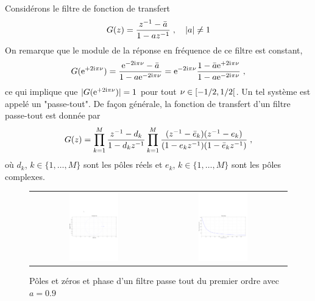 \begin{example}
Considérons le filtre de fonction de transfert
\[
G(z)= \frac{z^{-1} - \bar{a}}{1-a z^{-1}} \;, \quad |a| \ne 1
\]
On remarque que le module de la réponse en fréquence de ce filtre est constant, \ie\
\[
G(\mathrm{e}^{+2 \mathrm{i} \pi \nu})= \frac{\mathrm{e}^{-2 \mathrm{i} \pi \nu} - \bar{a}}{1 - a \mathrm{e}^{-2 \mathrm{i} \pi \nu}}= \mathrm{e}^{-2 \mathrm{i} \pi \nu} \frac{1 - \bar{a} \mathrm{e}^{+2 \mathrm{i} \pi \nu}}{1 - a \mathrm{e}^{-2 \mathrm{i} \pi \nu}} \;,
\]
ce qui implique que $|G(\mathrm{e}^{+2 \mathrm{i} \pi \nu})|= 1$ pour tout $\nu \in \left[-1/2,1/2\right[$. Un tel système est appelé un "passe-tout". De façon générale, la fonction de transfert d'un filtre passe-tout est donnée par
\[
G(z)= \prod_{k=1}^M \frac{z^{-1} - d_k}{1 - d_k z^{-1}} \prod_{k=1}^M \frac{(z^{-1} - \bar{e}_k)(z^{-1}-e_k)}{(1-e_k z^{-1})(1-\bar{e}_k z^{-1})} \;,
\]
où $d_k$, $k \in \{1,\dots,M\}$ sont les pôles réels et $e_k$, $k \in \{1,\dots,M\}$ sont les pôles complexes.

\begin{figure}
  \centering
  \begin{tabular}{cc}
  \includegraphics[width=0.4\textwidth]{Figures/polezero}& \includegraphics[width=0.4\textwidth]{Figures/phasedelay1}
    \end{tabular}
  \caption{Pôles et zéros et phase d'un filtre passe tout du premier ordre avec $a=0.9$}
  \label{fig:passetout-1}
\end{figure}


\end{example}

\begin{example}

\end{example} 